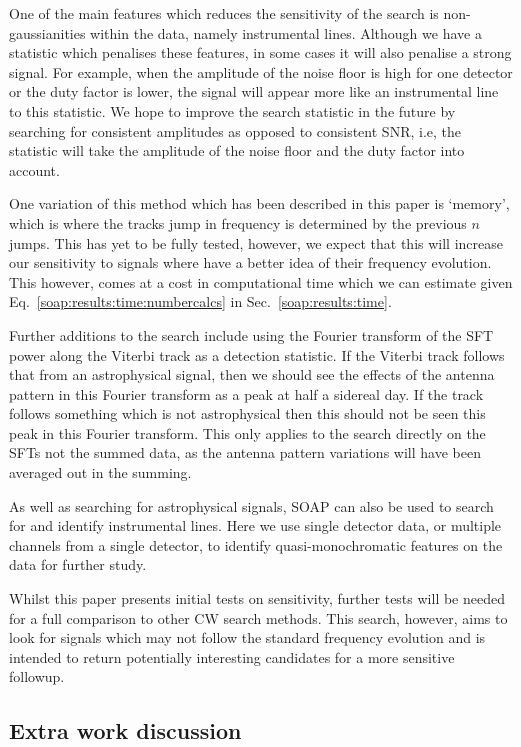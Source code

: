 One of the main features which reduces the sensitivity of the search is non-gaussianities within the data, namely instrumental lines. Although we have a statistic which penalises these features, in some cases it will also penalise a strong signal. For example, when the amplitude of the noise floor is high for one detector or the duty factor is lower, the signal will appear more like an instrumental line to this statistic. We hope to improve the search statistic in the future by searching for consistent amplitudes as opposed to consistent \gls{SNR}, i.e, the statistic will take the amplitude of the noise floor and the duty factor into account.

One variation of this method which has been described in this paper is `memory', which is where the tracks jump in frequency is determined by the previous $n$ jumps. This has yet to be fully tested, however, we expect that this will increase our sensitivity to signals where have a better idea of their frequency evolution. This however, comes at a cost in computational time which we can estimate given Eq.~\ref{soap:results:time:numbercalcs} in Sec.~\ref{soap:results:time}.

Further additions to the search include using the Fourier transform of the \gls{SFT} power along the Viterbi track as a detection statistic.
If the Viterbi track follows that from an astrophysical signal, then we should see the effects of the antenna pattern in this Fourier transform as a peak at half a sidereal day.
If the track follows something which is not astrophysical then this should not be seen this peak in this Fourier transform.
This only applies to the search directly on the \glspl{SFT} not the summed data, as the antenna pattern variations will have been averaged out in the summing.

As well as searching for astrophysical signals, SOAP can also be used to search for and identify instrumental lines. Here we use single detector data, or multiple channels from a single detector, to identify quasi-monochromatic features on the data for further study.

Whilst this paper presents initial tests on sensitivity, further tests will be needed for a full comparison to other \gls{CW} search methods.  
This search, however, aims to look for signals which may not follow the standard
frequency evolution and is intended to return potentially interesting
candidates for a more sensitive followup.

\subsection{Extra work discussion}

